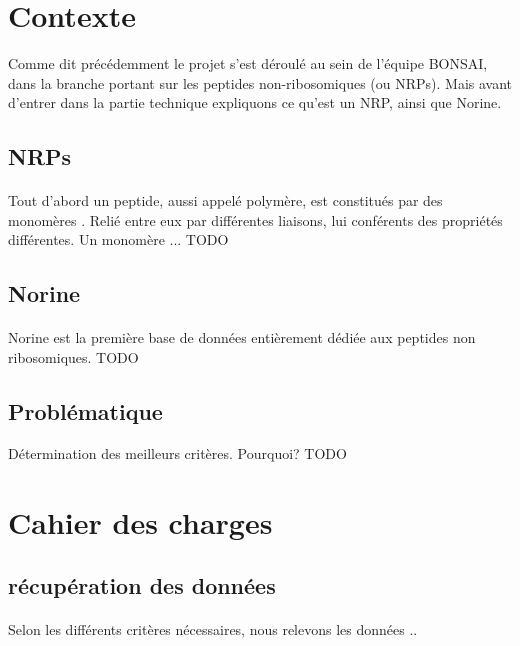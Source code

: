 \documentclass[a4paper,10pt]{report}
\begin{document}
    \section{Contexte}
      Comme dit précédemment le projet s'est déroulé au sein de l'équipe BONSAI, dans la branche portant sur les peptides non-ribosomiques (ou NRPs). Mais avant d'entrer dans la partie technique expliquons ce qu'est un NRP, ainsi que Norine.
      
      \subsection{NRPs}
	\paragraph{}
	  Tout d'abord un peptide, aussi appelé polymère, est constitués par des monomères . Relié entre eux par différentes liaisons, lui conférents des propriétés différentes. 
	  Un monomère ... 
	  TODO
	  
      \subsection{Norine}
	\paragraph{}
	  Norine est la première base de données entièrement dédiée aux peptides non ribosomiques.
	  TODO
    
	
      \subsection{Problématique}
	Détermination des meilleurs critères. 
	Pourquoi? 
	TODO
	
    \section{Cahier des charges}
	 
	 
	 \subsection{récupération des données}
	 
	    \paragraph{} 
	    Selon les différents critères nécessaires, nous relevons les données .. 
	    
\end{document}
